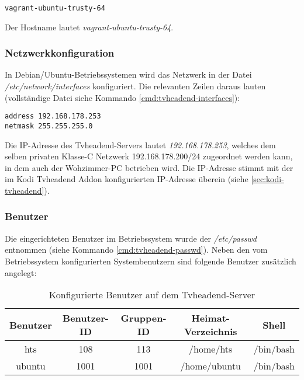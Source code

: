 \begin{cmd}
\begin{verbatim}
vagrant-ubuntu-trusty-64
\end{verbatim}
\caption{icat -o 2048 tvheadend.raw 473}
\end{cmd}

Der Hostname lautet \textit{vagrant-ubuntu-trusty-64}.

\subsubsection{Netzwerkkonfiguration}
\label{sec:tvheadend-network}

In Debian/Ubuntu-Betriebssystemen wird das Netzwerk in der Datei \textit{/etc/network/interfaces} konfiguriert. Die relevanten Zeilen daraus lauten (vollständige Datei siehe Kommando \autoref{cmd:tvheadend-interfaces}):

\begin{verbatim}
address 192.168.178.253
netmask 255.255.255.0
\end{verbatim}

Die IP-Adresse des Tvheadend-Servers lautet \textit{192.168.178.253}, welches dem selben privaten \mbox{Klasse-C} Netzwerk 192.168.178.200/24 zugeordnet werden kann, in dem auch der Wohzimmer-PC betrieben wird. Die IP-Adresse stimmt mit der im Kodi Tvheadend Addon konfigurierten IP-Adresse überein (siehe \autoref{sec:kodi-tvheadend}).

\subsubsection{Benutzer}
\label{sec:tvheadend-users}

Die eingerichteten Benutzer im Betriebssystem wurde der \textit{/etc/passwd} entnommen (siehe Kommando \autoref{cmd:tvheadend-passwd}). Neben den vom Betriebssystem konfigurierten Systembenutzern sind folgende Benutzer zusätzlich angelegt:

\begin{table}[H]
\centering
\begin{tabular}{ccccc}
\hline 
Benutzer & Benutzer-ID & Gruppen-ID & Heimat-Verzeichnis & Shell \\ 
\hline 
hts & 108 & 113 & /home/hts & /bin/bash \\ 
\hline 
ubuntu & 1001 & 1001 & /home/ubuntu & /bin/bash \\ 
\hline 
\end{tabular} 
\caption{Konfigurierte Benutzer auf dem Tvheadend-Server}
\end{table}

